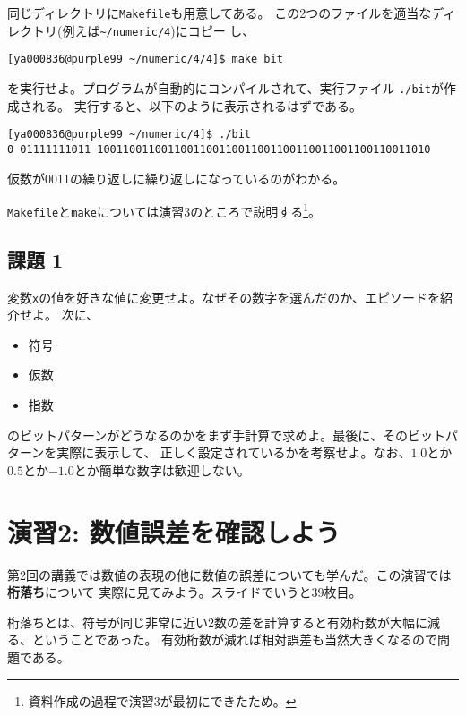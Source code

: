 \documentclass[a4paper]{jsarticle}
\begin{document}
同じディレクトリに\texttt{Makefile}も用意してある。
この2つのファイルを適当なディレクトリ(例えば\texttt{\~{}/numeric/4})にコピー
し、
\begin{lstlisting}
[ya000836@purple99 ~/numeric/4/4]$ make bit
\end{lstlisting}
を実行せよ。プログラムが自動的にコンパイルされて、実行ファイル
\texttt{./bit}が作成される。
実行すると、以下のように表示されるはずである。
\begin{lstlisting}
[ya000836@purple99 ~/numeric/4]$ ./bit
0 01111111011 1001100110011001100110011001100110011001100110011010
\end{lstlisting}
仮数が0011の繰り返しに繰り返しになっているのがわかる。

\texttt{Makefile}と\texttt{make}については演習3のところで説明する\footnote{資料作成の過程で演習3が最初にできたため。}。

\subsection*{課題 1}
変数\texttt{x}の値を好きな値に変更せよ。なぜその数字を選んだのか、エピソードを紹介せよ。
次に、
\begin{itemize}
\item 符号
\item 仮数
\item 指数
\end{itemize}
のビットパターンがどうなるのかをまず手計算で求めよ。最後に、そのビットパターンを実際に表示して、
正しく設定されているかを考察せよ。なお、$1.0$とか$0.5$とか$-1.0$とか簡単な数字は歓迎しない。

\section*{演習2: 数値誤差を確認しよう}

第2回の講義では数値の表現の他に数値の誤差についても学んだ。この演習では\textbf{桁落ち}について
実際に見てみよう。スライドでいうと39枚目。

桁落ちとは、符号が同じ非常に近い2数の差を計算すると有効桁数が大幅に減る、ということであった。
有効桁数が減れば相対誤差も当然大きくなるので問題である。
\end{document}
